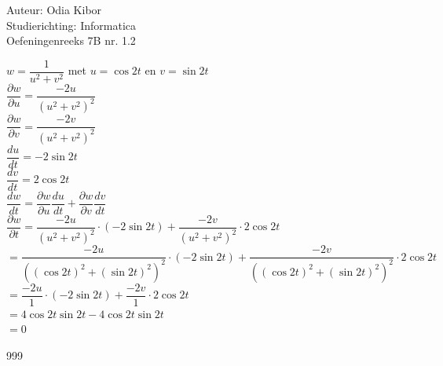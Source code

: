 \documentclass[a4paper]{article}
\begin{document}
  
\noindent \large Auteur: Odia Kibor \\
\noindent \large Studierichting: Informatica\\
\noindent \large Oefeningenreeks 7B nr. 1.2
\\

\medskip

\normalsize


$w = \dfrac{1}{u^2 + v^2}$ met $u = \cos 2t$ en $v = \sin 2t$ \\

$\dfrac{\partial w}{\partial u} = \dfrac{-2u}{(u^2 + v^2)^2}$ \\

$\dfrac{\partial w}{\partial v} = \dfrac{-2v}{(u^2 + v^2)^2}$ \\

$\dfrac{du}{dt} = -2\sin 2t$ \\

$\dfrac{dv}{dt} = 2\cos 2t$ \\

$\dfrac{dw}{dt} = \dfrac{\partial w}{\partial u} \dfrac{du}{dt} + \dfrac{\partial w}{\partial v} \dfrac{dv}{dt}$ \\

$\dfrac{\partial w}{\partial t} = \dfrac{-2u}{(u^2 + v^2)^2} \cdot (-2\sin 2t) + \dfrac{-2v}{(u^2 + v^2)^2} \cdot 2\cos 2t$ \\

$= \dfrac{-2u}{((\cos 2t)^2 + (\sin 2t)^2)^2} \cdot (-2\sin 2t) + \dfrac{-2v}{((\cos 2t)^2 + (\sin 2t)^2)^2} \cdot 2\cos 2t$ \\

$= \dfrac{-2u}{1} \cdot (-2\sin 2t) + \dfrac{-2v}{1} \cdot 2\cos 2t$ \\

$= 4\cos 2t\sin 2t - 4\cos 2t\sin 2t$ \\

$= 0$ \\




















\begin{thebibliography}{999}
\end{thebibliography}
\end{document}
